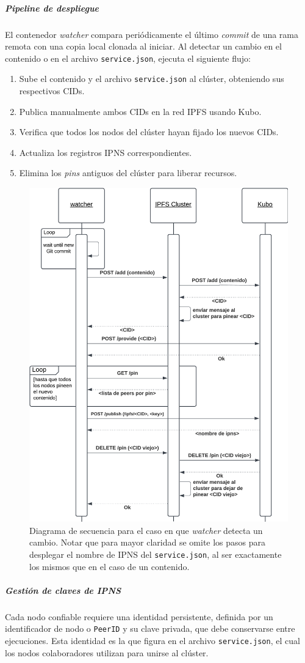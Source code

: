 \subparagraph{Pipeline de despliegue} El contenedor \textit{watcher} compara periódicamente el último \textit{commit} de una rama remota con una copia local clonada al iniciar. Al detectar un cambio en el contenido o en el archivo \texttt{service.json}, ejecuta el siguiente flujo:
\begin{enumerate}
    \item Sube el contenido y el archivo \texttt{service.json} al clúster, obteniendo sus respectivos CIDs.
    \item Publica manualmente ambos CIDs en la red IPFS usando Kubo.
    \item Verifica que todos los nodos del clúster hayan fijado los nuevos CIDs.
    \item Actualiza los registros IPNS correspondientes.
    \item Elimina los \textit{pins} antiguos del clúster para liberar recursos.
\end{enumerate}

\begin{figure}[H]
    \centering
    \includegraphics[width=0.5\linewidth]{img/solucion-ipfs/ds-trusted-peer.png}
    \caption{Diagrama de secuencia para el caso en que \textit{watcher} detecta un cambio. Notar que para mayor claridad se omite los pasos para desplegar el nombre de IPNS del \texttt{service.json}, al ser exactamente los mismos que en el caso de un contenido.}
    \label{fig:ds-contenedores-trusted-peer}
\end{figure}

\subparagraph{Gestión de claves de IPNS}

Cada nodo confiable requiere una identidad persistente, definida por un identificador de nodo o \texttt{PeerID} y su clave privada, que debe conservarse entre ejecuciones. Esta identidad es la que figura en el archivo \texttt{service.json}, el cual los nodos colaboradores utilizan para unirse al clúster.

